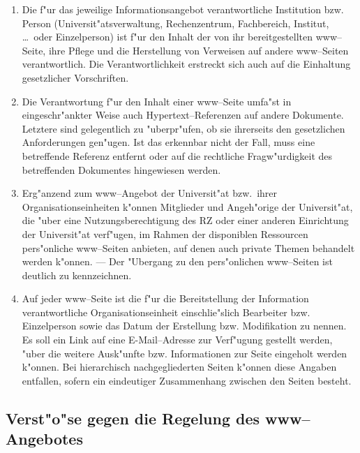 \begin{enumerate}
  \item Die f"ur das jeweilige Informationsangebot verantwortliche
        Institution bzw. Person (Universit"atsverwaltung,
        Rechenzentrum, Fachbereich, Institut, \dots\  oder Einzelperson) ist
        f"ur den Inhalt der von ihr bereitgestellten www--Seite,
        ihre Pflege und die Herstellung von Verweisen auf andere
        www--Seiten verantwortlich. Die Verantwortlichkeit erstreckt
        sich auch auf die Einhaltung gesetzlicher Vorschriften.

  \item Die Verantwortung f"ur den Inhalt einer www--Seite
        umfa"st in eingeschr"ankter Weise auch
        Hypertext--Referenzen auf andere Dokumente. Letztere sind
        gelegentlich zu "uberpr"ufen, ob sie ihrerseits
        den gesetzlichen Anforderungen gen"ugen. Ist das erkennbar
        nicht der Fall, muss eine betreffende Referenz entfernt
        oder auf die rechtliche Fragw"urdigkeit des betreffenden
        Dokumentes hingewiesen werden.

  \item Erg"anzend zum www--Angebot der Universit"at bzw.\  ihrer
        Organisationseinheiten k"onnen Mitglieder und Angeh"orige
        der Universit"at, die "uber eine Nutzungsberechtigung
        des RZ oder einer anderen Einrichtung der Universit"at
        verf"ugen, im Rahmen der disponiblen Ressourcen
        pers"onliche www--Seiten
        anbieten, auf denen auch private Themen behandelt werden
        k"onnen. --- Der "Ubergang zu den pers"onlichen
        www--Seiten ist deutlich zu kennzeichnen.

  \item Auf jeder www--Seite ist die f"ur die Bereitstellung der
        Information verantwortliche Organisationseinheit
        einschlie"slich Bearbeiter bzw. Einzelperson sowie das
        Datum der Erstellung bzw. Modifikation zu nennen. Es soll ein
        Link auf eine E-Mail--Adresse zur Verf"ugung gestellt werden,
        "uber die weitere Ausk"unfte bzw. Informationen zur
        Seite eingeholt werden k"onnen. Bei hierarchisch
        nachgegliederten Seiten k"onnen diese Angaben entfallen,
        sofern ein eindeutiger Zusammenhang zwischen den Seiten besteht.
\end{enumerate}

\subsection{Verst"o"se gegen die Regelung des www--Angebotes}


